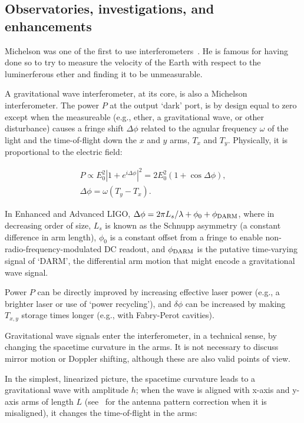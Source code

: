        \subsection{Observatories, investigations, and enhancements}
        \label{methods}

		Michelson was one of the first to use interferometers~\cite{michelson}. He is famous for having done so to try to measure the velocity of the Earth with respect to the luminerferous ether and finding it to be unmeasurable.

A gravitational wave interferometer, at its core, is also a Michelson interferometer. 
The power $P$ at the output `dark' port, is by design equal to zero except when the measureable (e.g., ether, a gravitational wave, or other disturbance) causes a fringe shift $\Delta \phi$ related to the agnular frequency $\omega$ of the light and the time-of-flight down the $x$ and $y$ arms, $T_x$ and $T_y$. 
Physically, it is proportional to the electric field: 

\begin{eqnarray}
P \propto E_0^2 \left| 1 + e^{i \Delta \phi}\right|^2 = 2 E_0^2 (1 + \cos \Delta \phi), \\
\Delta \phi = \omega (T_y - T_x).
\end{eqnarray}

In Enhanced and Advanced LIGO, $\Delta \phi = 2\pi L_s /\lambda + \phi_0 + \phi_{\textup{DARM}} $, where in decreasing order of size, $L_s$ is known as the Schnupp asymmetry (a constant difference in arm length), $\phi_0$ is a constant offset from a fringe to enable non-radio-frequency-modulated DC readout, and $\phi_{\textup{DARM}}$ is the putative time-varying signal of `DARM', the differential arm motion that might encode a gravitational wave signal. 

Power $P$ can be directly improved by increasing effective laser power (e.g., a brighter laser or use of `power recycling'), and $\delta \phi$ can be increased by making $T_{x,y}$ storage times longer (e.g., with Fabry-Perot cavities).

Gravitational wave signals enter the interferometer, in a technical sense, by changing the spacetime curvature in the arms. It is not necessary to discuss mirror motion or Doppler shifting, although these are also valid points of view. 

In the simplest, linearized picture, the spacetime curvature leads to a gravitational wave with amplitude $h$; when the wave is aligned with x-axis and y-axis arms of length $L$ (see~\cite{Jaranowski1998} for the antenna pattern correction when it is misaligned), it changes the time-of-flight in the arms:

